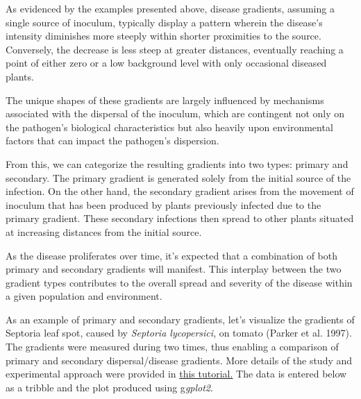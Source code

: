 \documentclass[
  letterpaper,
]{book}
\begin{document}
As evidenced by the examples presented above, disease gradients,
assuming a single source of inoculum, typically display a pattern
wherein the disease's intensity diminishes more steeply within shorter
proximities to the source. Conversely, the decrease is less steep at
greater distances, eventually reaching a point of either zero or a low
background level with only occasional diseased plants.

The unique shapes of these gradients are largely influenced by
mechanisms associated with the dispersal of the inoculum, which are
contingent not only on the pathogen's biological characteristics but
also heavily upon environmental factors that can impact the pathogen's
dispersion.

From this, we can categorize the resulting gradients into two types:
primary and secondary. The primary gradient is generated solely from the
initial source of the infection. On the other hand, the secondary
gradient arises from the movement of inoculum that has been produced by
plants previously infected due to the primary gradient. These secondary
infections then spread to other plants situated at increasing distances
from the initial source.

As the disease proliferates over time, it's expected that a combination
of both primary and secondary gradients will manifest. This interplay
between the two gradient types contributes to the overall spread and
severity of the disease within a given population and environment.

As an example of primary and secondary gradients, let's visualize the
gradients of Septoria leaf spot, caused by \emph{Septoria lycopersici},
on tomato (Parker et al. 1997). The gradients were measured during two
times, thus enabling a comparison of primary and secondary
dispersal/disease gradients. More details of the study and experimental
approach were provided in
\href{https://www.apsnet.org/edcenter/disimpactmngmnt/topc/EcologyAndEpidemiologyInR/ModelingDispersalGradients/Pages/PrimaryandSecondaryGradients.aspx}{this
tutorial.} The data is entered below as a tribble and the plot produced
using g\emph{gplot2}.
\end{document}

